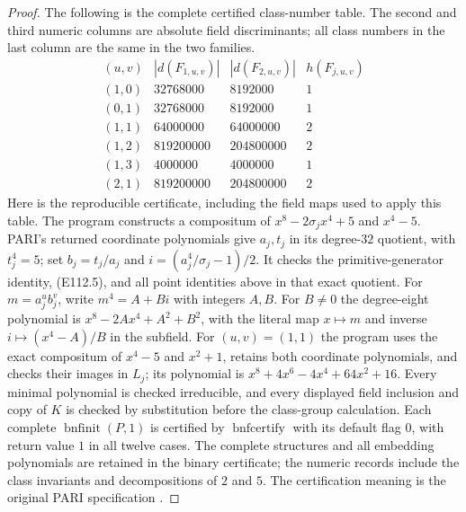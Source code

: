 \begin{proof}
The following is the complete certified class-number table.
The second and third numeric columns are absolute field
discriminants; all class numbers in the last column are the
same in the two families.
\[
\begin{array}{c|r|r|c}
(u,v)&|d(F_{1,u,v})|&|d(F_{2,u,v})|&h(F_{j,u,v})\\\hline
(1,0)&32768000&8192000&1\\
(0,1)&32768000&8192000&1\\
(1,1)&64000000&64000000&2\\
(1,2)&819200000&204800000&2\\
(1,3)&4000000&4000000&1\\
(2,1)&819200000&204800000&2
\end{array}
\tag{E112.13}
\]
Here is the reproducible certificate, including the field
maps used to apply this table.  The program constructs a
compositum of $x^8-2\sigma_jx^4+5$ and $x^4-5$.
PARI's returned coordinate polynomials give $a_j,t_j$ in
its degree-$32$ quotient, with $t_j^4=5$; set
$b_j=t_j/a_j$ and $i=(a_j^4/\sigma_j-1)/2$.
It checks the primitive-generator identity, (E112.5), and
all point identities above in that exact quotient.
For $m=a_j^ub_j^v$, write $m^4=A+Bi$ with integers $A,B$.
For $B\ne0$ the degree-eight polynomial is
$x^8-2Ax^4+A^2+B^2$, with the literal map $x\mapsto m$
and inverse $i\mapsto(x^4-A)/B$ in the subfield.
For $(u,v)=(1,1)$ the program uses the exact compositum
of $x^4-5$ and $x^2+1$, retains both coordinate polynomials,
and checks their images in $L_j$; its polynomial is
$x^8+4x^6-4x^4+64x^2+16$.
Every minimal polynomial is checked irreducible, and every
displayed field inclusion and copy of $K$ is checked by
substitution before the class-group calculation.
Each complete $\operatorname{bnfinit}(P,1)$ is certified by
$\operatorname{bnfcertify}$ with its default flag $0$, with
return value $1$ in all twelve cases.  The complete structures
and all embedding polynomials are retained in the binary
certificate; the numeric records include the class invariants
and decompositions of $2$ and $5$.  The certification meaning
is the original PARI specification
\cite[\texttt{bnfcertify}, default flag $0$]{E_PARICertifiedUnits}.


\end{proof}
